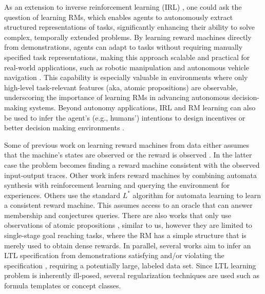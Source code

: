 \documentclass[letterpaper, 10 pt, conference]{ieeeconf}
\begin{document}
As an extension to inverse reinforcement learning (IRL) \cite{ng2000algorithms}, one could ask the question of learning RMs, which enables agents to autonomously extract structured representations of tasks, significantly enhancing their ability to solve complex, temporally extended problems. By learning reward machines directly from demonstrations, agents can adapt to tasks without requiring manually specified task representations, making this approach scalable and practical for real-world applications, such as robotic manipulation and autonomous vehicle navigation \cite{camacho2019ltl,icarte2023learning, xu2020joint,baert2024reward,camacho2021reward}. This capability is especially valuable in environments where only high-level task-relevant features (aka, atomic propositions) are observable, underscoring the importance of learning RMs in advancing autonomous decision-making systems. Beyond autonomy applications, IRL and RM learning can also be used to infer the agent's (e.g., humans') intentions to design incentives or better decision making environments \cite{nitschke2024amber}.

Some of previous work on learning reward machines from data either assumes that the machine's states are observed \cite{araki2019learning} or the reward is observed \cite{xu2020joint, icarte2023learning, hu2024reinforcement}. In the latter case the problem becomes finding a reward machine consistent with the observed input-output traces. Other work \cite{hasanbeig2024symbolic,hasanbeig2021deepsynth,furelos2020induction} infers reward machines by combining automata synthesis with reinforcement learning and querying the environment for experiences. Others \cite{xu2021active,memarian2020active} use the standard $L^*$ algorithm for automata learning \cite{angluin1987learning} to learn a consistent reward machine. This assumes access to an oracle that can answer membership and conjectures queries. There are also works that only use observations of atomic propositions \cite{camacho2021reward}, similar to us, however they are limited to single-stage goal reaching tasks, where the RM has a simple structure that is merely used to obtain dense rewards. In parallel, several works aim to infer an LTL specification from demonstrations satisfying and/or violating the specification \cite{neider2018learning, vazquez2020maximum}, requiring a potentially large, labeled data set. Since LTL learning problem is inherently ill-posed, several regularization techniques are used such as formula templates or concept classes.
\end{document}
